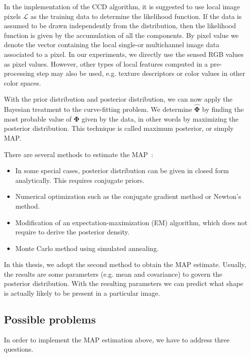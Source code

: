 In the implementation of the CCD algorithm, it is suggested to use local image pixels $\mathcal{L}$ as the training data to
determine the likelihood function. If the data is assumed to be drawn
 independently from the distribution, then the likelihood function is
given by the accumulation of all the components.
By pixel value we denote the vector containing the local single-or multichannel
image data associated to a pixel. In our experiments, we directly use the sensed RGB
values as pixel values. However, other types of local features computed in a pre-processing
step may also be used, e.g. texture descriptors or color values in
other color spaces.

With the prior distribution and posterior distribution, we can now
apply the Bayesian treatment to the curve-fitting problem.
We determine $\hat{\mathbf{\Phi}}$ by finding the most probable
value of $\mathbf{\Phi}$ given by the data, in other words by maximizing
the posterior distribution. This technique is called maximum
posterior, or simply MAP.

There are several methods to estimate the MAP~\cite{map}:
\begin{itemize}
\item In some special cases, posterior distribution can be given in
  closed form analytically. This requires conjugate priors.
\item Numerical optimization such as the conjugate gradient method or
  Newton's method.
\item Modification of an expectation-maximization (EM) algorithm,
  which does not require to derive the posterior density.
\item Monte Carlo method using simulated annealing.
\end{itemize}

In this thesis, we adopt the second method to obtain the MAP estimate.
Usually, the results are some parameters (e.g. mean and covariance) to
govern the posterior distribution. With the resulting parameters we
can predict what shape is actually likely to be present in a particular image.


\subsection{Possible problems}
\label{sec:prob}
In order to implement the MAP estimation above, we have to address
three questions.

